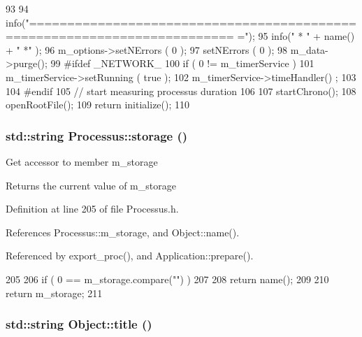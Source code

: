 \begin{DoxyCode}
93                                       {
94   info("=========================================================================
      =");
95   info("   * " + name() + " *" );
96   m_options->setNErrors ( 0 );
97   setNErrors ( 0 );
98   m_data->purge();
99 #ifdef _NETWORK_
100   if ( 0 != m_timerService ){
101     m_timerService->setRunning ( true );
102     m_timerService->timeHandler() ;
103   }
104 #endif
105   // start measuring processus duration
106   
107   startChrono();
108   openRootFile();
109   return initialize();
110 }
\end{DoxyCode}
\hypertarget{classProcessus_a33fa1a0b54a636e5cdd680669fd9ea51}{
\subsubsection[{storage}]{\setlength{\rightskip}{0pt plus 5cm}std::string Processus::storage ()}}
\label{classProcessus_a33fa1a0b54a636e5cdd680669fd9ea51}
Get accessor to member m\_\-storage \begin{DoxyReturn}{Returns}
the current value of m\_\-storage 
\end{DoxyReturn}


Definition at line 205 of file Processus.h.

References Processus::m\_\-storage, and Object::name().

Referenced by export\_\-proc(), and Application::prepare().


\begin{DoxyCode}
205                        {
206     if ( 0 == m_storage.compare("") )
207     {
208       return name();
209     }
210     return m_storage;
211   }
\end{DoxyCode}
\hypertarget{classObject_a73a0f1a41828fdd8303dd662446fb6c3}{
\subsubsection[{title}]{\setlength{\rightskip}{0pt plus 5cm}std::string Object::title ()}}
\label{classObject_a73a0f1a41828fdd8303dd662446fb6c3}


